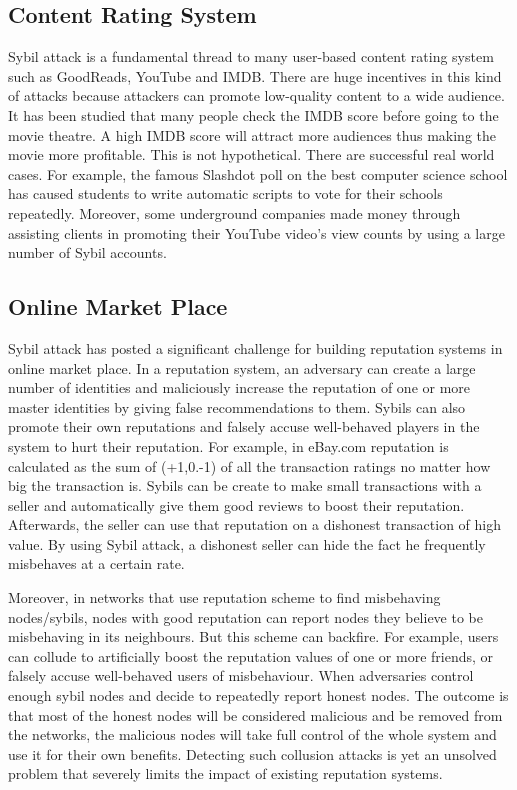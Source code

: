 \documentclass[conference]{IEEEtran}
\begin{document}
\subsection{Content Rating System}
Sybil attack is a fundamental thread to many user-based content rating system such as GoodReads, YouTube and IMDB. 
There are huge incentives in this kind of attacks because attackers can promote low-quality content to a wide audience. 
It has been studied that many people check the IMDB score before going to the movie theatre. 
A high IMDB score will attract more audiences thus making the movie more profitable. This is not hypothetical. 
There are successful real world cases. 
For example, the famous Slashdot poll on the best computer science school has caused students to write automatic scripts to vote for their schools repeatedly. 
Moreover, some underground companies made money through assisting clients in promoting their YouTube video's view counts by using a large number of Sybil accounts.\cite{Tran09SOC}

\subsection{Online Market Place}
Sybil attack has posted a significant challenge for building reputation systems in online market place. 
In a reputation system, an adversary can create a large number of identities and maliciously increase the reputation of one or more master identities by giving false 
recommendations to them. 
Sybils can also promote their own reputations and falsely accuse well-behaved players in the system to hurt their reputation. 
For example, in eBay.com reputation is calculated as the sum of (+1,0.-1) of all the transaction ratings no matter how big the transaction is. 
Sybils can be create to make small transactions with a seller and automatically give them good reviews to boost their reputation. 
Afterwards, the seller can use that reputation on a dishonest transaction of high value. 
By using Sybil attack, a dishonest seller can hide the fact he frequently misbehaves at a certain rate.

Moreover, in networks that use reputation scheme to find misbehaving nodes/sybils, 
nodes with good reputation can report nodes they believe to be misbehaving in its neighbours. 
But this scheme can backfire. 
For example, users can collude to artificially boost the reputation values of one or more friends, or falsely accuse well-behaved users of misbehaviour. 
When adversaries control enough sybil nodes and decide to repeatedly report honest nodes. 
The outcome is that most of the honest nodes will be considered malicious and be removed from the networks, 
the malicious nodes will take full control of the whole system and use it for their own benefits. 
Detecting such collusion attacks is yet an unsolved problem that severely limits the impact of existing reputation systems.\cite{Swamynathan10reputation}\cite{Lian07anempirical}
\end{document}
